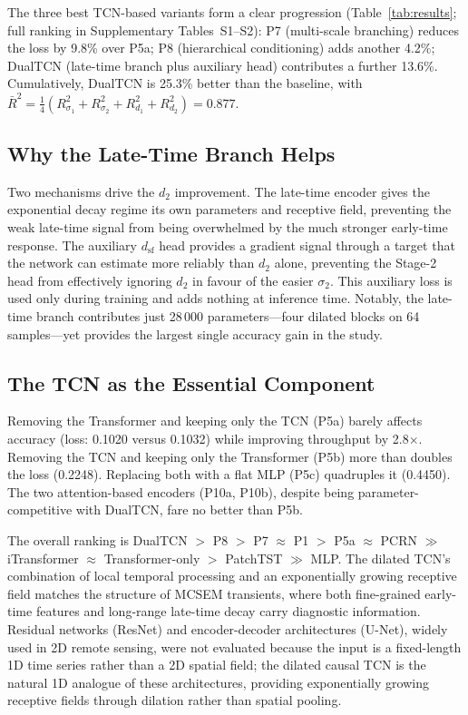 \documentclass[journal]{IEEEtran}
\begin{document}
The three best TCN-based variants form a clear progression
(Table~\ref{tab:results}; full ranking in Supplementary
Tables~S1--S2): P7 (multi-scale branching) reduces the loss by
9.8\% over P5a; P8 (hierarchical conditioning) adds another 4.2\%;
DualTCN (late-time branch plus auxiliary head) contributes a further
13.6\%. Cumulatively, DualTCN is 25.3\% better than the baseline,
with $\bar{R}^2 = \tfrac{1}{4}(R^2_{\sigma_1} + R^2_{\sigma_2}
+ R^2_{d_1} + R^2_{d_2}) = 0.877$.

\subsection{Why the Late-Time Branch Helps}

Two mechanisms drive the $d_2$ improvement. The late-time encoder
gives the exponential decay regime its own parameters and receptive
field, preventing the weak late-time signal from being overwhelmed by
the much stronger early-time response. The auxiliary
$d_\mathrm{sf}$ head provides a gradient signal through a target
that the network can estimate more reliably than $d_2$ alone,
preventing the Stage-2 head from effectively ignoring $d_2$ in
favour of the easier $\sigma_2$. This auxiliary loss is used only
during training and adds nothing at inference time. Notably, the
late-time branch contributes just 28\,000 parameters---four dilated
blocks on 64 samples---yet provides the largest single accuracy gain
in the study.

\subsection{The TCN as the Essential Component}

Removing the Transformer and keeping only the TCN (P5a) barely
affects accuracy (loss: 0.1020 versus 0.1032) while improving
throughput by 2.8$\times$. Removing the TCN and keeping only the
Transformer (P5b) more than doubles the loss (0.2248). Replacing
both with a flat MLP (P5c) quadruples it (0.4450). The two
attention-based encoders (P10a, P10b), despite being
parameter-competitive with DualTCN, fare no better than P5b.

The overall ranking is DualTCN $>$ P8 $>$ P7 $\approx$ P1 $>$
P5a $\approx$ PCRN $\gg$ iTransformer $\approx$
Transformer-only $>$ PatchTST $\gg$ MLP. The dilated TCN's
combination of local temporal processing and an exponentially growing
receptive field matches the structure of MCSEM transients, where both
fine-grained early-time features and long-range late-time decay carry
diagnostic information.  Residual networks (ResNet) and
encoder-decoder architectures (U-Net), widely used in 2D remote
sensing, were not evaluated because the input is a fixed-length 1D
time series rather than a 2D spatial field; the dilated causal TCN is
the natural 1D analogue of these architectures, providing
exponentially growing receptive fields through dilation rather than
spatial pooling.
\end{document}
